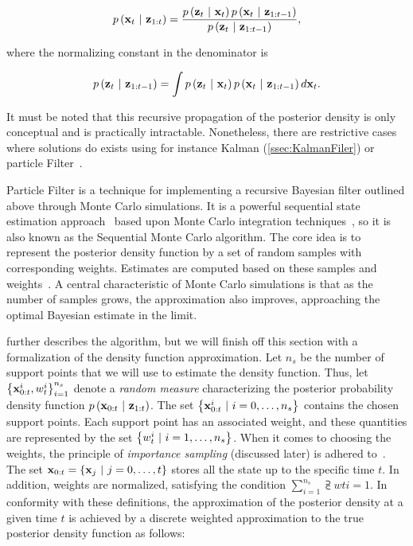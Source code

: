 \begin{equation}
    p \left( \mathbf{x}_t \ | \ \mathbf{z}_{1:t} \right) =
    \frac{
        p \left( \mathbf{z}_t \ | \ \mathbf{x}_{t} \right)
        p \left( \mathbf{x}_t \ | \ \mathbf{z}_{1:t - 1} \right)
    }{
        p \left( \mathbf{z}_t \ | \ \mathbf{z}_{1:t - 1} \right)
    },
\end{equation}

\noindent where the normalizing constant in the denominator is

\begin{equation}
    p \left( \mathbf{z}_t \ | \ \mathbf{z}_{1:t - 1} \right) =
    \int
    p \left( \mathbf{z}_t \ | \ \mathbf{x}_{t} \right)
    p \left( \mathbf{x}_t \ | \ \mathbf{z}_{1:t - 1} \right)
    d\mathbf{x}_t.
\end{equation}

\noindent It must be noted that this recursive propagation of the posterior density is only conceptual and is practically intractable. Nonetheless, there are restrictive cases where solutions do exists using for instance Kalman (\cref{ssec:KalmanFiler}) or particle Filter~\cite{Arulampalam2007}.

Particle Filter is a technique for implementing a recursive Bayesian filter outlined above through Monte Carlo simulations.  It is a powerful sequential state estimation approach~\cite{doucet2001introduction} based upon Monte Carlo integration techniques~\cite{mihaylova2007object}, so it is also known as the Sequential Monte Carlo algorithm. The core idea is to represent the posterior density function by a set of random samples with corresponding weights. Estimates are computed based on these samples and weights~\cite{Arulampalam2007}. A central characteristic of Monte Carlo simulations is that as the number of samples grows, the approximation also improves, approaching the optimal Bayesian estimate in the limit.

\cite{Arulampalam2007} further describes the algorithm, but we will finish off this section with a formalization of the density function approximation. Let $n_s$ be the number of support points that we will use to estimate the density function. Thus, let ${\left\{ {{\mathbf{x}}_{0:t}^{i}, {w}_{t}^{i}} \right\}}_{i = 1}^{n_s}$ denote a \emph{random measure} characterizing the posterior probability density function $p \left( \mathbf{x}_{0:t} \ | \ \mathbf{z}_{1:t} \right)$. The set $\left\{ {{\mathbf{x}}_{0:t}^{i} \ | \ i = 0, \dots, n_s} \right\}$ contains the chosen support points. Each support point has an associated weight, and these quantities are represented by the set $\left\{ {{w}_{t}^{i} \ | \ i = 1, \dots, n_s} \right\}$. When it comes to choosing the weights, the principle of \emph{importance sampling} (discussed later) is adhered to~\cite{bergman1999recursive, stordal2008sequential}. The set $\vect{x}_{0:t} = \cbrackets{\vect{x}_j \ | \ j = 0, \dots, t}$ stores all the state up to the specific time $t$. In addition, weights are normalized, satisfying the condition $\sum_{i = 1}^{n_s} \supsub{w}{t}{i} = 1$. In conformity with these definitions, the approximation of the posterior density at a given time $t$ is achieved by a discrete weighted approximation to the true posterior density function as follows:

